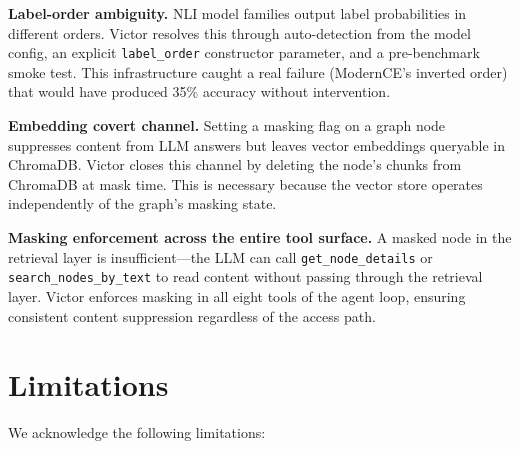 \documentclass[letterpaper]{article}          %
\theoremstyle{plain}
\theoremstyle{definition}
\theoremstyle{remark}
\begin{document}
\textbf{Label-order ambiguity.} NLI model families output label probabilities in
different orders. Victor resolves this through auto-detection from the model
config, an explicit \texttt{label\_order} constructor parameter, and a
pre-benchmark smoke test. This infrastructure caught a real failure (ModernCE's
inverted order) that would have produced 35\% accuracy without intervention.

\textbf{Embedding covert channel.} Setting a masking flag on a graph node
suppresses content from LLM answers but leaves vector embeddings queryable in
ChromaDB. Victor closes this channel by deleting the node's chunks from ChromaDB
at mask time. This is necessary because the vector store operates independently
of the graph's masking state.

\textbf{Masking enforcement across the entire tool surface.} A masked node in
the retrieval layer is insufficient---the LLM can call \texttt{get\_node\_details}
or \texttt{search\_nodes\_by\_text} to read content without passing through the
retrieval layer. Victor enforces masking in all eight tools of the agent loop,
ensuring consistent content suppression regardless of the access path.


\section{Limitations}

We acknowledge the following limitations:
\end{document}
